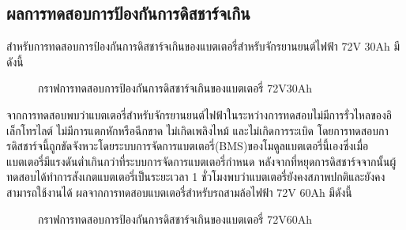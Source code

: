 \subsection{ผลการทดสอบการป้องกันการดิสชาร์จเกิน}
สำหรับการทดสอบการป้องกันการดิสชาร์จเกินของแบตเตอรี่สำหรับจักรยานยนต์ไฟฟ้า 72V 30Ah มีดังนี้
\begin{center}
	\begin{figure}[H]
		\centering
		\captionsetup{justification=centering,margin=2cm}
		\caption{กราฟการทดสอบการป้องกันการดิสชาร์จเกินของแบตเตอรี่ 72V30Ah}
	\end{figure}
\end{center}
จากการทดสอบพบว่าแบตเตอรี่สำหรับจักรยานยนต์ไฟฟ้าในระหว่างการทดสอบไม่มีการรั่วไหลของอิเล็กโทรไลต์ ไม่มีการแตกหักหรือฉีกขาด ไม่เกิดเพลิงไหม้ และไม่เกิดการระเบิด
โดยการทดสอบการดิสชาร์จนี้ถูกขัดจังหวะโดยระบบการจัดการแบตเตอรี่(BMS)ของโมดูลแบตเตอรี่นี้เองซึ่งเมื่อแบตเตอรี่มีแรงดันต่ำเกินกว่าที่ระบบการจัดการแบตเตอรี่กำหนด
หลังจากที่หยุดการดิสชาร์จจากนั้นผู้ทดสอบได้ทำการสังเกตแบตเตอรี่เป็นระยะเวลา 1 ชั่วโมงพบว่าแบตเตอรี่ยังคงสภาพปกติและยังคงสามารถใช้งานได้
\newline\hspace*{2cm}
ผลจากการทดสอบแบตเตอรี่สำหรับรถสามล้อไฟฟ้า 72V 60Ah มีดังนี้
\begin{center}
	\begin{figure}[H]
		\centering
		\captionsetup{justification=centering,margin=2cm}
		\caption{กราฟการทดสอบการป้องกันการดิสชาร์จเกินของแบตเตอรี่ 72V60Ah}
	\end{figure}
\end{center}
